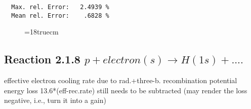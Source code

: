 \begin{verbatim}
  Max. rel. Error:   2.4939 %
  Mean rel. Error:    .6828 %

\end{verbatim}
\begin{figure} \label{2.1.5io}
\epsfxsize=18truecm
\end{figure}
\newpage

\subsection{
  Reaction 2.1.8  $p + electron(s)  \rightarrow H(1s) + ....$
}

   effective electron cooling rate due to rad.+three-b. recombination
   potential energy loss 13.6*(eff-rec.rate) still needs to be
   subtracted (may render the loss negative, i.e., turn it into a gain)

